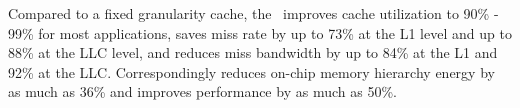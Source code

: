 Compared to a fixed granularity cache, the \AC\ improves cache utilization to 90\% - 99\% for most applications, saves miss rate by up to 73\% at the L1 level and up to 88\% at the LLC level, and reduces miss bandwidth by up to 84\% at the L1 and 92\% at the LLC. Correspondingly reduces on-chip memory hierarchy energy by as much as 36\% and improves performance by as much as 50\%.

